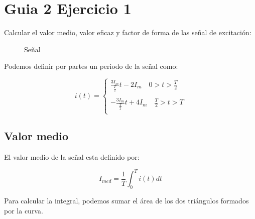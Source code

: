 \chapter{Guia 2 Ejercicio 1}

Calcular el valor medio, valor eficaz y factor de forma de las señal de excitación:


\begin{figure}[h]
  \centering
  \caption{Señal}
\end{figure}

Podemos definir por partes un periodo de la señal como:

\begin{equation}
i(t) =
  \begin{cases}
    \frac{3I_m}{\frac{T}{2}} t - 2I_m \quad 0>t>\frac{T}{2}\\\\
    -\frac{3I_m}{\frac{T}{2}} t + 4I_m \quad \frac{T}{2}>t>T\\
  \end{cases}
\end{equation}

\section{Valor medio}

El valor medio de la señal esta definido por:

\begin{equation}
  I_{med}= \frac{1}{T} \int_0^T i(t) dt
\end{equation}

Para calcular la integral, podemos sumar el área de los dos triángulos formados por la curva.

